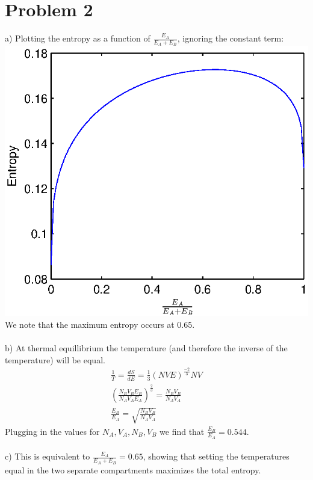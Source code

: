 \documentclass[a4paper,10pt]{article}
\numberwithin{equation}{section}
\begin{document}
\section{Problem 2}
a) Plotting the entropy as a function of $\frac{E_A}{E_A+E_B}$, ignoring the constant term:
\includegraphics{p1}
\\
We note that the maximum entropy occurs at 0.65.
\\ \\
b) At thermal equillibrium the temperature (and therefore the inverse of the temperature) will be equal.
\begin{gather}
 \frac{1}{T}=\frac{dS}{dE}=\frac{1}{3}(NVE)^{\frac{-2}{3}}NV\\
 \left (\frac{N_BV_BE_B}{N_AV_AE_A}\right )^{\frac{2}{3}}=\frac{N_BV_B}{N_AV_A}\\
 \frac{E_B}{E_A}=\sqrt{\frac{N_BV_B}{N_AV_A}}
\end{gather}
Plugging in the values for $N_A, V_A,N_B,V_B$ we find that $\frac{E_B}{E_A}=0.544$.
\\ \\
c) This is equivalent to $\frac{E_A}{E_A+E_B}=0.65$, 
showing that setting the temperatures equal in the two separate compartments maximizes the total entropy.
\end{document}
